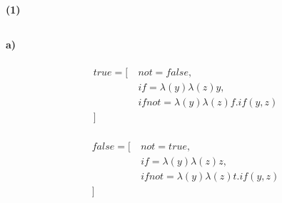 \documentclass[10pt,a4paper]{article}
\begin{document}
\subsection{}
\vspace*{5mm}
	\begin{center}
		\begin{scprooftree}
		\def\extraVskip{5pt}

    
    \RightLabel{[Upd]}
\RightLabel{[Sel]}
		\end{scprooftree}    
	\end{center}
	\vspace{5mm}
	\begin{center}\textbf{(1)}
		\begin{scprooftree}
		\def\extraVskip{5pt}


        \RightLabel{[Upd]}
    \RightLabel{[Sel]}
		\end{scprooftree}    
	\end{center}
\subsection{}
\paragraph{a)}
\setlength{\columnsep}{-5cm}
\begin{multicols}{2}
\begin{align*}
true = [~&not = false,  \\
&if = \lambda(y)\lambda(z)y, \\
&ifnot = \lambda(y)\lambda(z)f.if(y,z) \\
]~& \\
\end{align*}

\begin{align*}
false = [~&not = true,  \\
&if = \lambda(y)\lambda(z)z, \\
&ifnot = \lambda(y)\lambda(z)t.if(y,z) \\
]~& \\
\end{align*}
\end{multicols}
\end{document}
